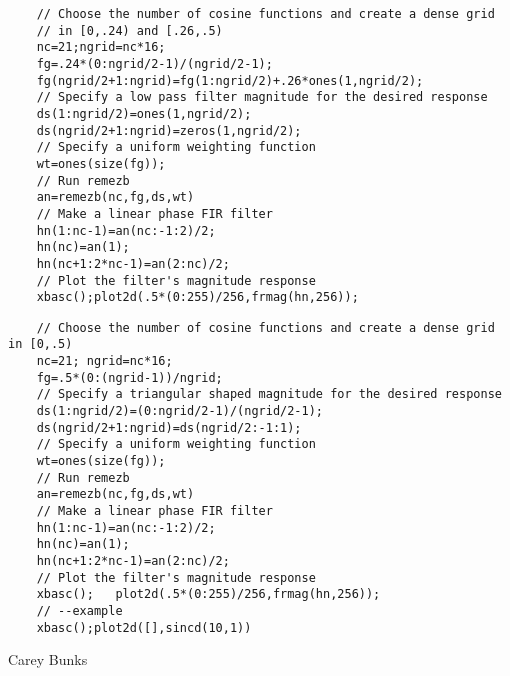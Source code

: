\begin{examples}
  \begin{Verbatim}
    // Choose the number of cosine functions and create a dense grid 
    // in [0,.24) and [.26,.5)
    nc=21;ngrid=nc*16;
    fg=.24*(0:ngrid/2-1)/(ngrid/2-1);
    fg(ngrid/2+1:ngrid)=fg(1:ngrid/2)+.26*ones(1,ngrid/2);
    // Specify a low pass filter magnitude for the desired response
    ds(1:ngrid/2)=ones(1,ngrid/2);
    ds(ngrid/2+1:ngrid)=zeros(1,ngrid/2);
    // Specify a uniform weighting function
    wt=ones(size(fg));
    // Run remezb
    an=remezb(nc,fg,ds,wt)
    // Make a linear phase FIR filter 
    hn(1:nc-1)=an(nc:-1:2)/2;
    hn(nc)=an(1);
    hn(nc+1:2*nc-1)=an(2:nc)/2;
    // Plot the filter's magnitude response
    xbasc();plot2d(.5*(0:255)/256,frmag(hn,256));
  \end{Verbatim}

  \begin{Verbatim}
    // Choose the number of cosine functions and create a dense grid in [0,.5)
    nc=21; ngrid=nc*16;
    fg=.5*(0:(ngrid-1))/ngrid;
    // Specify a triangular shaped magnitude for the desired response
    ds(1:ngrid/2)=(0:ngrid/2-1)/(ngrid/2-1);
    ds(ngrid/2+1:ngrid)=ds(ngrid/2:-1:1);
    // Specify a uniform weighting function
    wt=ones(size(fg));
    // Run remezb
    an=remezb(nc,fg,ds,wt)
    // Make a linear phase FIR filter 
    hn(1:nc-1)=an(nc:-1:2)/2;
    hn(nc)=an(1);
    hn(nc+1:2*nc-1)=an(2:nc)/2;
    // Plot the filter's magnitude response
    xbasc();   plot2d(.5*(0:255)/256,frmag(hn,256));
    // --example 
    xbasc();plot2d([],sincd(10,1)) 
  \end{Verbatim}
\end{examples}
\begin{manseealso}
\end{manseealso}
\begin{authors}
  Carey Bunks
\end{authors}
